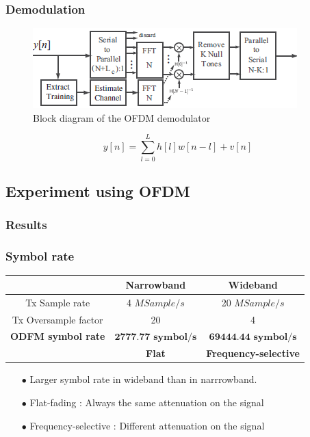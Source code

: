 \documentclass[11pt]{beamer}
\begin{document}
\begin{frame}
\frametitle{Demodulation}
\begin{figure}[!ht]
         \centering \includegraphics[scale=0.75]{img/OFDDM_demodulator.png}
 \caption{Block diagram of the OFDM demodulator}\label{fig3}  
\end{figure}
\begin{equation}  
 y[n]=\sum_{l=0}^{L} h[l]w[n-l]+v[n]
 \end{equation}
\end{frame}

\subsection{Experiment using OFDM}
\subsubsection{Results}

\begin{frame}
\frametitle{Symbol rate}
\begin{center}
	\begin{tabular}{c|c|c}
		  & Narrowband & Wideband\\
		  \hline
	Tx Sample rate & 4 $MSample/s$ & 20 $MSample/s$ \\	  
	Tx Oversample factor & 20 & 4\\
	\textbf{ODFM symbol rate} &  $\textbf{2777.77 symbol/s}$ & $\textbf{69444.44 symbol/s}$ \\ 
	\hline
     & \color{red} \textbf{Flat}  & \color{red} \textbf{Frequency-selective}\\                               
	\end{tabular}
	\label{tab1}
\end{center}
\begin{itemize}
\item[$\bullet$] Larger symbol rate in wideband than in narrrowband.
\item[$\bullet$] Flat-fading : Always the same attenuation on the signal
\item[$\bullet$] Frequency-selective : Different attenuation on the signal
\end{itemize}

\end{frame}
\end{document}
